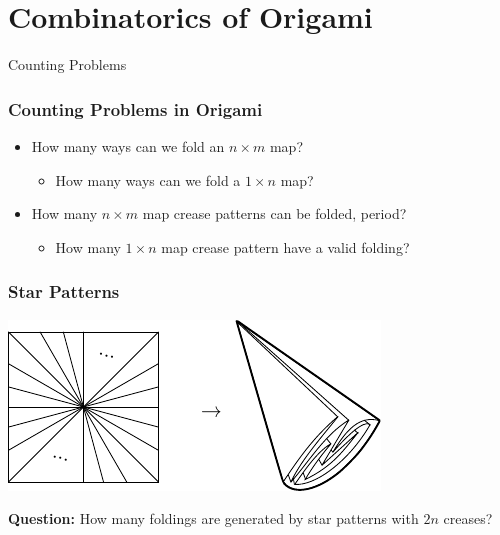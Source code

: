 \documentclass{beamer}
\begin{document}

\section{Combinatorics of Origami}

\newcommand{\R}{\mathsf{R}}
\renewcommand{\L}{\mathsf{L}}

\begin{frame}
	\begin{center}
	\Huge{Counting Problems}
	\end{center}
\end{frame}

\begin{frame}
\frametitle{Counting Problems in Origami}
\begin{itemize}
\item How many ways can we fold an $n\times m$ map?
	\begin{itemize}

	\item<2-> How many ways can we fold a $1\times n$ map?
	\end{itemize}
\item How many $n\times m$ map crease patterns can be folded, period?
	\begin{itemize}
	\item<3-> How many $1\times n$ map crease pattern have a valid folding?

	\end{itemize}
\end{itemize}
	\end{frame}

\begin{frame}
\frametitle{Star Patterns}
\pause
\begin{center}
\includegraphics[width=.8\textwidth]{meanders/star-cp.pdf}
\end{center}
\pause
\textbf{Question:} How many foldings are generated by star patterns with $2n$ creases?
\end{frame}
\end{document}
